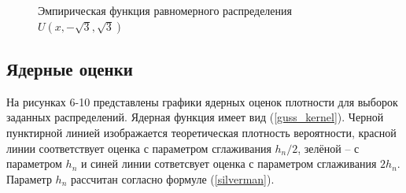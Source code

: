 \documentclass[12pt]{article}
\newcommand{\lskip}{\hfill\break}
\begin{document}
\begin{flushleft}
\begin{figure}[h]
\begin{minipage}[h]{0.325\linewidth}
        \end{minipage}
        \caption{Эмпирическая функция равномерного распределения $U(x, -\sqrt{3}, \sqrt{3})$}
        \end{figure}

    \subsection{Ядерные оценки}

        На рисунках 6-10 представлены графики ядерных оценок плотности для выборок заданных распределений. Ядерная функция имеет вид (\ref{guss_kernel}). Черной пунктирной линией изображается теоретическая плотность вероятности, красной линии соответствует оценка с параметром сглаживания $h_n / 2$, зелёной -- с параметром $h_n$ и синей линии сответсвует оценка с параметром сглаживания $2h_n$. Параметр $h_n$ рассчитан согласно формуле (\ref{silverman}).
        \lskip
        \lskip


\end{flushleft}
\end{document}
